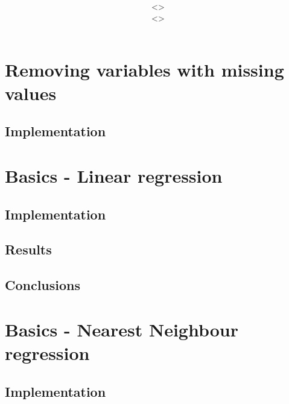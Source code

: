\documentclass[12pt,a4paper]{article}
\title{\vspace{2in}\textmd{\hmwkClass\\\textbf{\hmwkTitle}}\\\normalsize\vspace{0.1in}\small{\hmwkDueDate}\\\vspace{4in}}
\date{}
\author{\textbf{\hmwkAuthorNameA} $\;$<\texttt{\href{mailto:laane2@illinois.edu}{\hmwkAuthorEmailA}}>\\\textbf{\hmwkAuthorNameB} $\;$<\texttt{\href{mailto:ruizcep2@illinois.edu}{\hmwkAuthorEmailB}}>}
\begin{document}
\begin{singlespace}

\begin{titlepage}
\maketitle
\thispagestyle{empty}
\end{titlepage}

\tableofcontents
\newpage


\clearpage

\section{Removing variables with missing values}
\subsection{Implementation}


\section{Basics - Linear regression}
\subsection{Implementation}


\subsection{Results}
\subsection{Conclusions}

\section{Basics - Nearest Neighbour regression}
\subsection{Implementation}



\end{singlespace}
\end{document}
